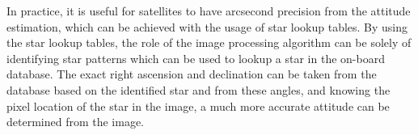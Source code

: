 \documentclass[10pt,twocolumn,letterpaper]{article}
\begin{document}
In practice, it is useful for satellites to have arcsecond precision from the attitude estimation, which can be achieved with the usage of star lookup tables. By using the star lookup tables, the role of the image processing algorithm can be solely of identifying star patterns which can be used to lookup a star in the on-board database. The exact right ascension and declination can be taken from the database based on the identified star and from these angles, and knowing the pixel location of the star in the image, a much more accurate attitude can be determined from the image.


{\small


}
\end{document}
